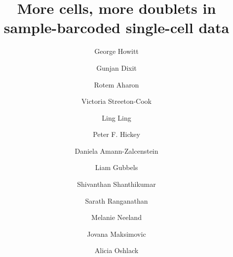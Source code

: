 \documentclass[unnumsec,webpdf,modern,large]{oup-authoring-template}
\begin{document}
	
	
	
	
	\title[Finding multiplets]{More cells, more doublets in sample-barcoded single-cell data}
	
	\author[1, 2]{George Howitt}
	\author[1, 2]{Gunjan Dixit}
	\author[1,2]{Rotem Aharon}
	\author[1]{Victoria Streeton-Cook}
	\author[3]{Ling Ling}
	\author[3,4]{Peter F. Hickey}
	\author[3,4]{Daniela Amann-Zalcenstein}
	\author[5]{Liam Gubbels}
	\author[5,6,7]{Shivanthan Shanthikumar}
	\author[5,6,7]{Sarath Ranganathan}
	\author[5,6]{Melanie Neeland}
	\author[1, 2]{Jovana Maksimovic}
	\author[1, 2, 8,$\ast$]{Alicia Oshlack}
	
	
	\address[1]{Computational Biology Program, Peter MacCallum Cancer Centre, Parkville, VIC, Australia}
	\address[2]{Sir Peter MacCallum Department of Oncology, University of Melbourne, Parkville, VIC, Australia}
	\address[3]{The Walter and Eliza Hall Institute of Medical Research, Parkville, VIC 3052, Australia}
	\address[4]{Department of Medical Biology, University of Melbourne, Parkville, VIC, Australia}
	\address[5]{Respiratory Diseases, Murdoch Children’s Research Institute, Parkville, VIC, Australia}
	\address[6]{Respiratory and Sleep Medicine, Royal Children’s Hospital, Parkville, VIC, Australia}
	\address[7]{Department of Paediatrics, University of Melbourne, Parkville, VIC, Australia}
	\address[8]{School of Mathematics and Statistics, University of Melbourne, Parkville, VIC, Australia}
		
		
	
	
	
\end{document}

